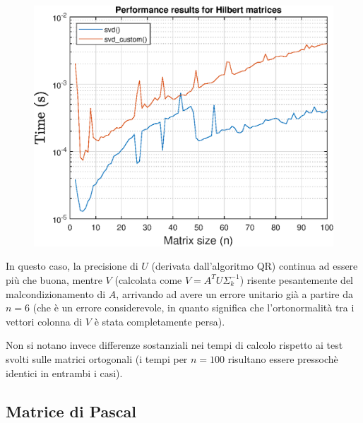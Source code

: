 \begin{figure}[!htb]
\endminipage\hfill
{}  
\includegraphics[width=\linewidth]{imgs/06_-_Performance_results_for_Hilbert_matrices.eps}
\endminipage
\end{figure}

In questo caso, la precisione di $U$ (derivata dall'algoritmo QR) continua ad 
essere più che buona, mentre $V$ (calcolata come $V = A^T U \Sigma_{k}^{-1}$) 
risente pesantemente del malcondizionamento di $A$, arrivando ad avere un errore 
unitario già a partire da $n = 6$ (che è un errore considerevole, in quanto 
significa che l'ortonormalità tra i vettori colonna di $V$ è stata completamente 
persa).

Non si notano invece differenze sostanziali nei tempi di calcolo rispetto ai 
test svolti sulle matrici ortogonali (i tempi per $n = 100$ risultano essere 
pressochè identici in entrambi i casi).


\newpage
\subsection{Matrice di Pascal}

